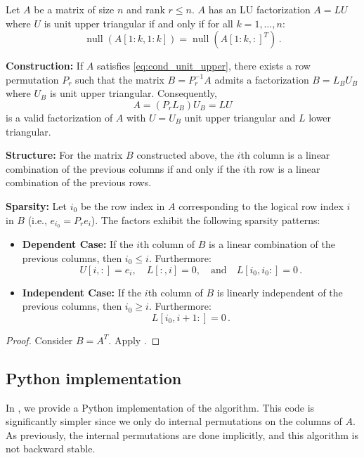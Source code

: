 \documentclass[10pt,twoside]{siamart1116}
\DeclareMathOperator{\nl}{null}
\numberwithin{theorem}{section}
\begin{document}
\begin{corollary}\label{corr:main_unit_upper}
  Let $A$ be a matrix of size $n$ and rank $r \le n$. $A$ has an LU factorization $A = LU$ where $U$ is unit upper triangular if and only if for all $k = 1, \ldots, n$:
  \begin{equation}
    \label{eq:cond_unit_upper}
    \nl(A[1:k,1:k]) = \nl({A[1:k,:]}^T) \,.
  \end{equation}

  \noindent\textbf{Construction:} If $A$ satisfies \cref{eq:cond_unit_upper}, there exists a row permutation $P_r$ such that the matrix $B = P_r^{-1} A$ admits a factorization $B = L_B U_B$ where $U_B$ is unit upper triangular. Consequently,
  \[ A = (P_r L_B) U_B = L U \]
  is a valid factorization of $A$ with $U=U_B$ unit upper triangular and $L$ lower triangular.

  \noindent\textbf{Structure:} For the matrix $B$ constructed above, the $i$th column is a linear combination of the previous columns if and only if the $i$th row is a linear combination of the previous rows.

  \noindent\textbf{Sparsity:} Let $i_0$ be the row index in $A$ corresponding to the logical row index $i$ in $B$ (i.e., $e_{i_0} = P_r e_i$). The factors exhibit the following sparsity patterns:
  \begin{itemize}
    \item \textbf{Dependent Case:} If the $i$th column of $B$ is a linear combination of the previous columns, then $i_0 \le i$. Furthermore:
      \[ U[i,:] = e_i, \quad L[:,i] = 0, \quad \text{and} \quad L[i_0, i_0:] = 0 \,. \]
    \item \textbf{Independent Case:} If the $i$th column of $B$ is linearly independent of the previous columns, then $i_0 \ge i$. Furthermore:
      \[ L[i_0, i+1:] = 0 \,. \]
  \end{itemize}
\end{corollary}

\begin{proof}
  Consider $B = A^T$. Apply .
\end{proof}

\subsection{Python implementation}

In , we provide a Python implementation of the algorithm. This code is significantly simpler since we only do internal permutations on the columns of $A$. As previously, the internal permutations are done implicitly, and this algorithm is not backward stable.
\end{document}
